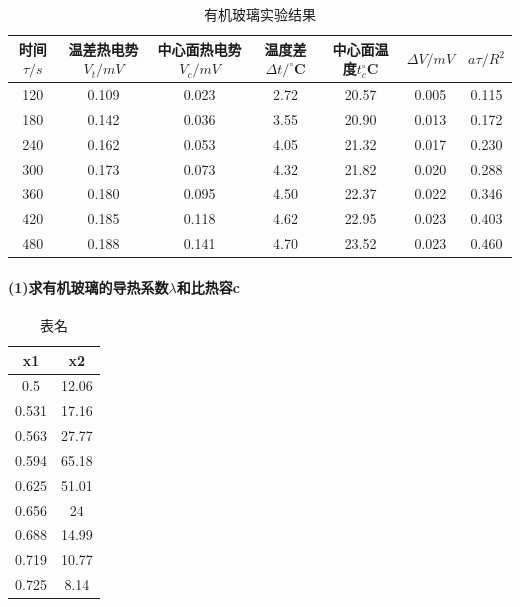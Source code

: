 \documentclass[12pt,a4paper]{article}
\begin{document}
	\begin{table}[htbp]
	\centering
		\caption{有机玻璃实验结果}
		\vspace{1em}
	  	\resizebox{\textwidth}{20mm}%
		{ 
	    \begin{tabular}{ccccccc}
	    \toprule
	    时间$\tau/s$ & 温差热电势$V_t/mV$ & 中心面热电势$V_c/mV$ & 温度差$\Delta t/^{\circ}$C & 中心面温度$t_c^{\circ}$C & $\Delta V/mV$ & $a\tau/R^2$ \\
	    \midrule
	    120   & 0.109 & 0.023 & 2.72 & 20.57 & 0.005 & 0.115 \\
	    180   & 0.142 & 0.036 & 3.55 & 20.90 & 0.013 & 0.172 \\
	    240   & 0.162 & 0.053 & 4.05 & 21.32 & 0.017 & 0.230 \\
	    300   & 0.173 & 0.073 & 4.32 & 21.82 & 0.020 & 0.288 \\
	    360   & 0.180 & 0.095 & 4.50 & 22.37 & 0.022 & 0.346 \\
	    420   & 0.185 & 0.118 & 4.62 & 22.95 & 0.023 & 0.403 \\
	    480   & 0.188 & 0.141 & 4.70 & 23.52 & 0.023 & 0.460 \\
	    \bottomrule
	    \end{tabular}
		}
	  	\label{tab:data}
	\end{table}

	\paragraph{(1)求有机玻璃的导热系数$\lambda$和比热容c}
	
	\begin{table}[htbp]
		\centering
			\caption{表名}
			\vspace{1em}
			\resizebox{0.2\textwidth}{25.0mm}
			{
			\begin{tabular}{cc}
			\toprule
			x1 & x2 \\
			\midrule
			0.5 & 12.06 \\
			0.531 & 17.16 \\
			0.563 & 27.77 \\
			0.594 & 65.18 \\
			0.625 & 51.01 \\
			0.656 & 24 \\
			0.688 & 14.99 \\
			0.719 & 10.77 \\
			0.725 & 8.14 \\
			\bottomrule
			\end{tabular}
			}
			\label{tab:data2}
	\end{table}
	
\end{document}
